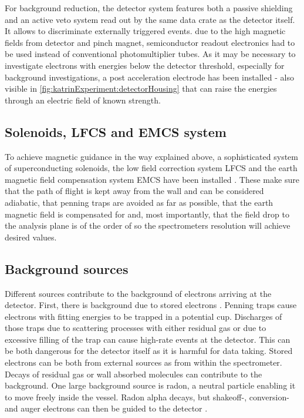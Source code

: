      
      For background reduction, the detector system features both a passive shielding and an active veto system read out by the same data crate as the detector itself. It allows to discriminate externally triggered events. due to the high magnetic fields from detector and pinch magnet, semiconductor readout electronics had to be used instead of conventional photomultiplier tubes.
      As it may be necessary to investigate electrons with energies below the detector threshold, especially for background investigations, a post acceleration electrode has been installed - also visible in \ref{fig:katrinExperiment:detectorHousing} that can raise the energies through an electric field of known strength.
      \subsection{Solenoids, LFCS and EMCS system}
      \label{ch:The KATRIN experiment:sec:Experimental setup:subsec:Solenoids, LFCS and EMCS system}
      
      To achieve magnetic guidance in the way explained above, a sophisticated system of superconducting solenoids, the low field correction system LFCS and the earth magnetic field compensation system EMCS have been installed \cite{airCoilSystem}. These make sure that the path of flight is kept away from the wall and can be considered adiabatic, that penning traps are avoided as far as possible, that the earth magnetic field is compensated for and, most importantly, that the field drop to the analysis plane is of the order of  so the spectrometers resolution will achieve desired values.
      

      \subsection{Background sources}
      \label{ch:The KATRIN experiment:sec:Experimental setup:subsec:BackgroundSources}
      Different sources contribute to the background of electrons arriving at the detector. First, there is background due to stored electrons \cite{storedElectrons}. Penning traps cause electrons with fitting energies to be trapped in a potential cup. Discharges of those traps due to scattering processes with either residual gas or due to excessive filling of the trap can cause high-rate events at the detector. This can be both dangerous for the detector itself as it is harmful for data taking. Stored electrons can be both from external sources as from within the spectrometer. Decays of residual gas or wall absorbed molecules can contribute to the background. One large background source is radon, a neutral particle enabling it to move freely inside the vessel. Radon alpha decays, but shakeoff-, conversion- and auger electrons can then be guided to the detector \cite{radonGoerhard}.
      
